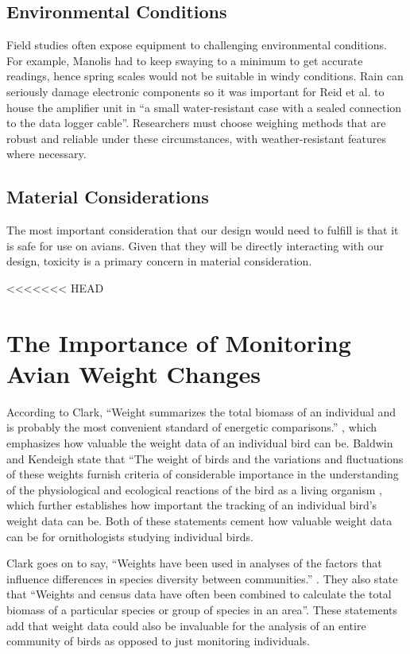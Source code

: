 \documentclass[class=report,11pt,crop=false]{standalone}
\begin{document}
\subsection{Environmental Conditions}
Field studies often expose equipment to challenging environmental conditions. For example, Manolis \cite{manoils2024simple} had to keep swaying to a minimum to get accurate readings, hence spring scales would not be suitable in windy conditions. Rain can seriously damage electronic components so it was important for Reid et al. \cite{reid1999measurement} to house the amplifier unit in “a small water-resistant case with a sealed connection to the data logger cable”. Researchers must choose weighing methods that are robust and reliable under these circumstances, with weather-resistant features where necessary.

\subsection{Material Considerations}
The most important consideration that our design would need to fulfill is that it is safe for use on avians. Given that they will be directly interacting with our design, toxicity is a primary concern in material consideration.

<<<<<<< HEAD
\pagebreak
\section{The Importance of Monitoring Avian Weight Changes}
According to Clark, “Weight summarizes the total biomass of an individual and is probably the most convenient standard of energetic comparisons.” \cite{ClarckWeights}, which emphasizes how valuable the weight data of an individual bird can be. Baldwin and Kendeigh state that “The weight of birds and the variations and fluctuations of these weights furnish criteria of considerable importance in the understanding of the physiological and ecological reactions of the bird as a living organism \cite{BaldwinWeights}, which further establishes how important the tracking of an individual bird’s weight data can be. Both of these statements cement how valuable weight data can be for ornithologists studying individual birds.

Clark goes on to say, “Weights have been used in analyses of the factors that influence differences in species diversity between communities.” \cite{ClarckWeights}. They also state that “Weights and census data have often been combined to calculate the total biomass of a particular species or group of species in an area”. These statements add that weight data could also be invaluable for the analysis of an entire community of birds as opposed to just monitoring individuals.
\end{document}
